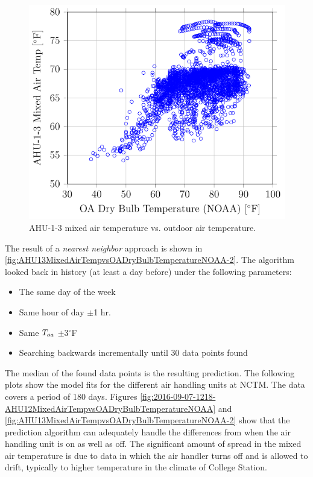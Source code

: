 \begin{figure}
\centering
\includegraphics[]{Plots/2016-06-13-1459-AHU13MixedAirTempvsOADryBulbTemperatureNOAA.pdf}
\caption{AHU-1-3 mixed air temperature vs. outdoor air temperature.}
\label{fig:AHU13MixedAirTempvsOADryBulbTemperatureNOAA}
\end{figure}


The result of a \textit{nearest neighbor} approach is shown in \figref{} \ref{fig:AHU13MixedAirTempvsOADryBulbTemperatureNOAA-2}. The algorithm looked back in history (at least a day before) under the following parameters:

\begin{itemize}
    \item The same day of the week
    \item Same hour of day \(\pm\)1 hr.
    \item Same \(T_{oa}{}\) \(\pm\)3\(^\circ\)F
    \item Searching backwards incrementally until 30 data points found
\end{itemize}

The median of the found data points is the resulting prediction. The following plots show the model fits for the different air handling units at NCTM. The data covers a period of 180 days. Figures \ref{fig:2016-09-07-1218-AHU12MixedAirTempvsOADryBulbTemperatureNOAA} and \ref{fig:AHU13MixedAirTempvsOADryBulbTemperatureNOAA-2} show that the prediction algorithm can adequately handle the differences from when the air handling unit is on as well as off. The significant amount of spread in the mixed air temperature is due to data in which the air handler turns off and is allowed to drift, typically to higher temperature in the climate of College Station. 

